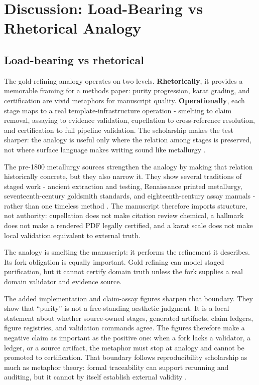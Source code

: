 \documentclass[
  english,
]{article}
\begin{document}
\newpage

\section{Discussion: Load-Bearing vs Rhetorical
Analogy}\label{sec:discussion}

\subsection{Load-bearing vs
rhetorical}\label{load-bearing-vs-rhetorical}

The gold-refining analogy operates on two levels. \textbf{Rhetorically},
it provides a memorable framing for a methods paper: purity progression,
karat grading, and certification are vivid metaphors for manuscript
quality. \textbf{Operationally}, each stage maps to a real
template-infrastructure operation - smelting to claim removal, assaying
to evidence validation, cupellation to cross-reference resolution, and
certification to full pipeline validation. The scholarship makes the
test sharper: the analogy is useful only where the relation among stages
is preserved, not where surface language makes writing sound like
metallurgy \citep{gentner1983structure, hesse1966models}.

The pre-1800 metallurgy sources strengthen the analogy by making that
relation historically concrete, but they also narrow it. They show
several traditions of staged work - ancient extraction and testing,
Renaissance printed metallurgy, seventeenth-century goldsmith standards,
and eighteenth-century assay manuals - rather than one timeless method
\citep{pliny_natural_history_33, biringuccio_pirotechnia_1540, agricola_de_re_metallica_1556, badcock_touchstone_1678, cramer_assaying_metals_1741}.
The manuscript therefore imports structure, not authority: cupellation
does not make citation review chemical, a hallmark does not make a
rendered PDF legally certified, and a karat scale does not make local
validation equivalent to external truth.

The analogy is smelting the manuscript: it performs the refinement it
describes. Its fork obligation is equally important. Gold refining can
model staged purification, but it cannot certify domain truth unless the
fork supplies a real domain validator and evidence source.

The added implementation and claim-assay figures sharpen that boundary.
They show that ``purity'' is not a free-standing aesthetic judgment. It
is a local statement about whether source-owned stages, generated
artifacts, claim ledgers, figure registries, and validation commands
agree. The figures therefore make a negative claim as important as the
positive one: when a fork lacks a validator, a ledger, or a source
artifact, the metaphor must stop at analogy and cannot be promoted to
certification. That boundary follows reproducibility scholarship as much
as metaphor theory: formal traceability can support rerunning and
auditing, but it cannot by itself establish external validity
\citep{peng2011reproducible, wilkinson2016fair, ioannidis2005false}.
\end{document}
